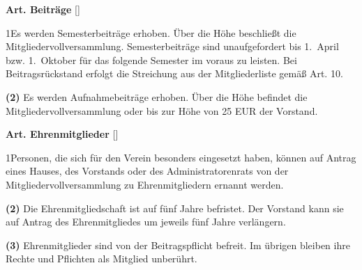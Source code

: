 \documentclass[12pt]{article}
\newcommand{\Satz}[2]{

\begin{samepage}
{\bf (#1)} #2
\end{samepage}
}
\newenvironment{Artikel}[2]{
\bigskip \centerline{{\bf Art. #1} [#2]}
\nopagebreak
}{
}
\begin{document}

\begin{Artikel}{8}{Beiträge}

\Satz{1}{Es werden Semesterbeiträge erhoben.
  Über die Höhe beschließt die Mitgliedervollversammlung.
  Semesterbeiträge sind unaufgefordert bis \mbox{1. April} bzw. \mbox{1. Oktober} für das folgende Semester im voraus zu leisten.
  Bei Beitragsrückstand erfolgt die Streichung aus der Mitgliederliste gemäß Art. 10.}

\Satz{2}{Es werden Aufnahmebeiträge erhoben.
  Über die Höhe befindet die Mitgliedervollversammlung oder bis zur Höhe von 25 EUR der Vorstand.}

\end{Artikel}

\begin{Artikel}{9}{Ehrenmitglieder}

\Satz{1}{Personen, die sich für den Verein besonders eingesetzt haben, können auf Antrag eines Hauses, des Vorstands oder des Administratorenrats von der Mitgliedervollversammlung zu Ehrenmitgliedern ernannt werden.}

\Satz{2}{Die Ehrenmitgliedschaft ist auf fünf Jahre befristet.
  Der Vorstand kann sie auf Antrag des Ehrenmitgliedes um jeweils fünf Jahre verlängern.}

\Satz{3}{Ehrenmitglieder sind von der Beitragspflicht befreit.
  Im übrigen bleiben ihre Rechte und Pflichten als Mitglied unberührt.}

\end{Artikel}
\end{document}
